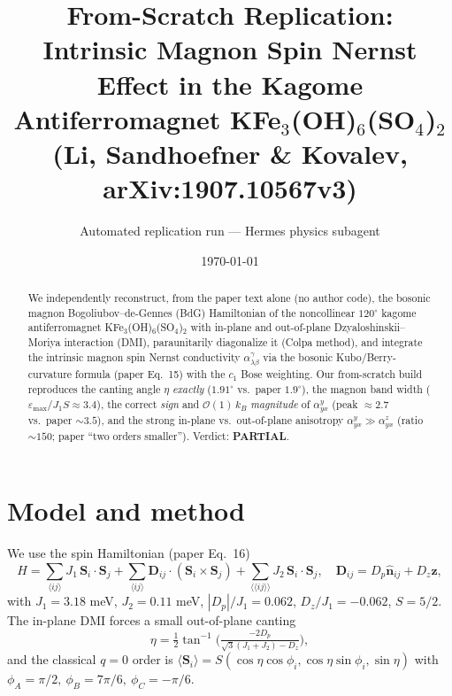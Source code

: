 \documentclass[11pt]{article}
\title{From-Scratch Replication:\\ Intrinsic Magnon Spin Nernst Effect in the
Kagome Antiferromagnet KFe$_3$(OH)$_6$(SO$_4$)$_2$\\
\large (Li, Sandhoefner \& Kovalev, arXiv:1907.10567v3)}
\author{Automated replication run --- Hermes physics subagent}
\date{\today}
\begin{document}
\maketitle

\begin{abstract}
We independently reconstruct, from the paper text alone (no author code), the
bosonic magnon Bogoliubov--de-Gennes (BdG) Hamiltonian of the noncollinear
$120^\circ$ kagome antiferromagnet KFe$_3$(OH)$_6$(SO$_4$)$_2$ with in-plane and
out-of-plane Dzyaloshinskii--Moriya interaction (DMI), paraunitarily diagonalize
it (Colpa method), and integrate the intrinsic magnon spin Nernst conductivity
$\alpha^\gamma_{\lambda\beta}$ via the bosonic Kubo/Berry-curvature formula
(paper Eq.~15) with the $c_1$ Bose weighting. Our from-scratch build reproduces
the canting angle $\eta$ \emph{exactly} ($1.91^\circ$ vs.\ paper $1.9^\circ$),
the magnon band width ($\varepsilon_{\max}/J_1S \approx 3.4$), the correct
\emph{sign} and $\mathcal{O}(1)\,k_B$ \emph{magnitude} of $\alpha^y_{yx}$
(peak $\approx 2.7$ vs.\ paper $\sim 3.5$), and the strong in-plane vs.\
out-of-plane anisotropy $\alpha^y_{yx} \gg \alpha^z_{yx}$
(ratio $\sim 150$; paper ``two orders smaller''). Verdict: \textbf{PARTIAL}.
\end{abstract}

\section{Model and method}
We use the spin Hamiltonian (paper Eq.~16)
\begin{equation}
H = \sum_{\langle ij\rangle} J_1\,\mathbf S_i\cdot\mathbf S_j
  + \sum_{\langle ij\rangle}\mathbf D_{ij}\cdot(\mathbf S_i\times\mathbf S_j)
  + \sum_{\langle\langle ij\rangle\rangle} J_2\,\mathbf S_i\cdot\mathbf S_j,
\quad \mathbf D_{ij}=D_p\hat{\mathbf n}_{ij}+D_z\hat{\mathbf z},
\end{equation}
with $J_1=3.18$ meV, $J_2=0.11$ meV, $|D_p|/J_1=0.062$, $D_z/J_1=-0.062$,
$S=5/2$. The in-plane DMI forces a small out-of-plane canting
\begin{equation}
\eta=\tfrac12\tan^{-1}\!\Big(\tfrac{-2D_p}{\sqrt3(J_1+J_2)-D_z}\Big),
\end{equation}
and the classical $q=0$ order is
$\langle\mathbf S_i\rangle=S(\cos\eta\cos\phi_i,\cos\eta\sin\phi_i,\sin\eta)$ with
$\phi_A=\pi/2,\ \phi_B=7\pi/6,\ \phi_C=-\pi/6$.
\end{document}
